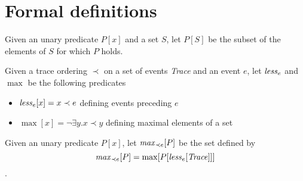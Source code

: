\documentclass{article}
\newcommand{\less}{{\it less}\xspace}
\newcommand{\eMax}[1]{{\it max}_{#1}}
\begin{document}



\appendix
\section{Formal definitions}
Given an unary predicate $P[x]$ and a set $S$, let $P[S]$ be the subset of 
the elements of $S$ for which $P$ holds.

Given a trace ordering $\prec$ on a set of events {\it Trace} and an event $e$, let $\less_e$ and $\max$ be
the following predicates
\begin{itemize}
\item $\less_e[x] = x \prec e$ defining events preceding $e$
\item $\max[x] = \neg\exists y. x \prec y$ defining maximal elements of a set
\end{itemize}

Given an unary predicate $P[x]$, let $\eMax{\prec e}[P]$ be the set
defined by 
$$\eMax{\prec e}[P] = \max[P[\less_e[{\it Trace}]]]$$.
\end{document}
